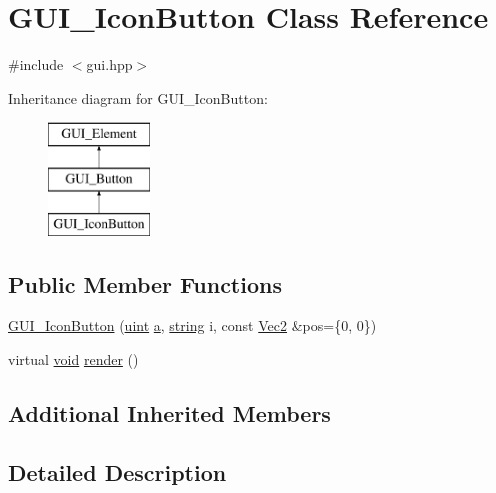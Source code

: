 \hypertarget{class_g_u_i___icon_button}{\section{G\-U\-I\-\_\-\-Icon\-Button Class Reference}
\label{class_g_u_i___icon_button}
}


{\ttfamily \#include $<$gui.\-hpp$>$}

Inheritance diagram for G\-U\-I\-\_\-\-Icon\-Button\-:\begin{figure}[H]
\begin{center}
\leavevmode
\includegraphics[height=3.000000cm]{class_g_u_i___icon_button}
\end{center}
\end{figure}
\subsection*{Public Member Functions}
\begin{DoxyCompactItemize}
\item 
\hyperlink{class_g_u_i___icon_button_ac32b0a3ace9a9fa5c1aff033e8c976e2}{G\-U\-I\-\_\-\-Icon\-Button} (\hyperlink{common_8hpp_a69aa29b598b851b0640aa225a9e5d61d}{uint} \hyperlink{_s_d_l__opengl__glext_8h_a3309789fc188587d666cda5ece79cf82}{a}, \hyperlink{_s_d_l__opengl__glext_8h_ae84541b4f3d8e1ea24ec0f466a8c568b}{string} i, const \hyperlink{class_vec2}{Vec2} \&pos=\{0, 0\})
\item 
virtual \hyperlink{_s_d_l__opengles2__gl2ext_8h_ae5d8fa23ad07c48bb609509eae494c95}{void} \hyperlink{class_g_u_i___icon_button_ad29f8f0902031536b52d21482eae04c1}{render} ()
\end{DoxyCompactItemize}
\subsection*{Additional Inherited Members}


\subsection{Detailed Description}


